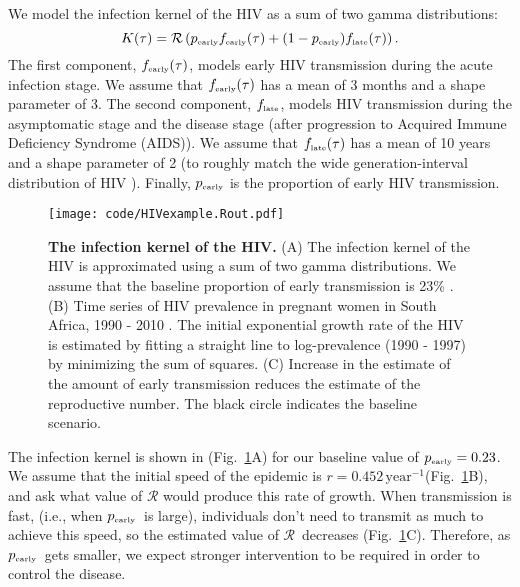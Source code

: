 \documentclass[12pt]{article}
\newcommand{\RR}{\ensuremath{{\mathcal R}}}
\newcommand{\tsub}[2]{#1_{{\textrm{\tiny #2}}}}
\newcommand{\pEarly}{\ensuremath{\tsub{p}{early}}}
\newcommand{\figref}[1]{Fig.~\ref{fig:#1}}
\newcommand{\figlab}[1]{\label{fig:#1}}
\begin{document}
We model the infection kernel of the HIV as a sum of two gamma distributions:
\begin{equation}
K(\tau) = \mathcal R \left(\tsub{p}{early} \tsub{f}{early}(\tau) + (1-\tsub{p}{early}) \tsub{f}{late}(\tau) \right).
\end{equation}
The first component, $\tsub{f}{early}(\tau)$, models early HIV transmission during the acute infection stage.
We assume that $\tsub{f}{early}(\tau)$ has a mean of 3 months \citep{hollingsworth2008hiv} and a shape parameter of 3.
The second component, $\tsub{f}{late}$, models HIV transmission during the asymptomatic stage and the disease stage (after progression to Acquired Immune Deficiency Syndrome (AIDS)).
We assume that $\tsub{f}{late}(\tau)$ has a mean of 10 years \citep{brookmeyer1989censoring, nishiura2019estimating} and a shape parameter of 2 (to roughly match the wide generation-interval distribution of HIV \citep{fraser2004factors}).
Finally, $\tsub{p}{early}$ is the proportion of early HIV transmission.

\begin{figure}[!th]
\texttt{[image: code/HIVexample.Rout.pdf]}
\caption{
\textbf{The infection kernel of the HIV.}
(A) The infection kernel of the HIV is approximated using a sum of two gamma distributions. We assume that the baseline proportion of early transmission is 23\% \citep{hayes2006amplified}.
(B) Time series of HIV prevalence in pregnant women in South Africa, 1990 - 2010 \citep{barron2013eliminating}. The initial exponential growth rate of the HIV is estimated by fitting a straight line to log-prevalence (1990 - 1997) by minimizing the sum of squares.
(C) Increase in the estimate of the amount of early transmission reduces the estimate of the reproductive number.
The black circle indicates the baseline scenario.
}
\figlab{example}
\end{figure}

The infection kernel is shown in (\figref{example}A) for our baseline value of  
$\tsub{p}{early} = 0.23$. We assume that the initial speed of the epidemic is $r=0.452\,\mathrm{year}^{-1}$(\figref{example}B), and ask what value of $\RR$ would produce this rate of growth.
When transmission is fast, (i.e., when \pEarly\ is large), individuals don't need to transmit as much to achieve this speed, so the estimated value of \RR\ decreases (\figref{example}C).
Therefore, as \pEarly\ gets smaller, we expect stronger intervention to be required in order to control the disease.
\end{document}
